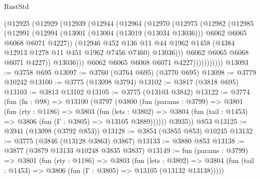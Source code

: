 \begin{lexlean}{RustStd}
\begin{coremodule}
                    (@12925
                      (@12929
                        (@12939
                          (@12944
                            (@12964
                              (@12970
                                (@12975
                                  (@12982
                                    (@12985
                                      (@12991
                                        (@12994
                                          (@13001
                                            (@13004 (@13019 (@13034 @13036)))
                                            @6062
                                            @6065
                                            @6068
                                            @6071
                                            @4227))
                                        (@12946
                                          @452
                                          @136
                                          @11
                                          @44
                                          @1962
                                          @1458
                                          (@4384 @12913 @1278 @11 @451 @1962 @7456 @7460)
                                          @13036)))
                                    @6062
                                    @6065
                                    @6068
                                    @6071
                                    @4227))
                                @13036)))
                          @6062
                          @6065
                          @6068
                          @6071
                          @4227)))))))))))
@13093 := @3758 @695
@13097 := @3760 (@3764 @695) (@3770 @695)
@13098 := @3779 @10242
@13100 := @3775 (@13098 @3794)
@13102 := @3817 (@3818 @695)
@13103 := @3813 @13102
@13105 := @3775 (@13103 @3842)
@13122 := @3774
    (fun (fn : @98) =>
    @13100
      (@3797
        (@3800
          (fun (params : @3799) =>
          @3801
            (fun (rty : @1186) =>
            @3803
              (fun (lets : @3802) =>
              @3804 (fun (tail : @1453) => @3806 (fun (Γ : @3805) => @13105 @3889))))))
        @3935))
    @853
@13125 := @3941 (@13098 (@3792 @853))
@13128 := @3854 (@3855 @853) @10245
@13132 := @3775 (@3846 (@13128 @3863) @3867)
@13133 := @3880 @853
@13138 := @3877 (@3879 @13133 @10248 @3835 @3837)
@13149 := fun (params : @3799) =>
  @3801
    (fun (rty : @1186) =>
    @3803
      (fun (lets : @3802) =>
      @3804 (fun (tail : @1453) => @3806 (fun (Γ : @3805) => @13105 (@13132 @13138)))))

\end{coremodule}
\end{lexlean}
